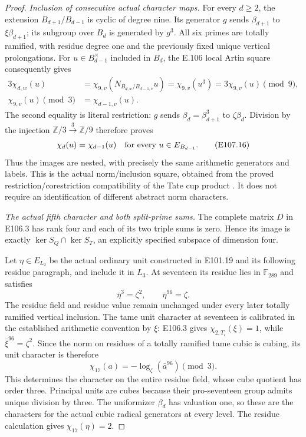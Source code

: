 \begin{proof}
\emph{Inclusion of consecutive actual character maps.}
For every \(d\ge2\), the extension
\(B_{d+1}/B_{d-1}\) is cyclic of degree nine. Its generator
\(g\) sends \(\beta_{d+1}\) to \(\xi\beta_{d+1}\);
its subgroup over \(B_d\) is generated by \(g^3\).
All six primes are totally ramified, with residue degree one
and the previously fixed unique vertical prolongations.
For \(u\in B_{d-1}^\times\) included in \(B_d\), the E.106
local Artin square consequently gives
\[
 \begin{aligned}
 3\chi_{d,w}(u)
  &=\chi_{9,v}(N_{B_{d,w}/B_{d-1,v}}u)
    =\chi_{9,v}(u^3)=3\chi_{9,v}(u)\pmod9,\\
 \chi_{9,v}(u)\pmod3&=\chi_{d-1,v}(u).
 \end{aligned}
 \tag{E107.15}
\]
The second equality is literal restriction: \(g\) sends
\(\beta_d=\beta_{d+1}^3\) to \(\zeta\beta_d\).
Division by the injection \(\mathbb Z/3\xrightarrow{\,3\,}\mathbb Z/9\)
therefore proves
\[
        \chi_d(u)=\chi_{d-1}(u)
              \quad\hbox{for every }u\in E_{B_{d-1}}.
 \tag{E107.16}
\]
Thus the images are nested, with precisely the same arithmetic
generators and labels. This is the actual norm/inclusion square,
obtained from the proved restriction/corestriction compatibility
of the Tate cup product
\cite[III,Theorem3.1 and its proof; III,\S4]{E_MilneCFT}.
It does not require an identification of different abstract norm
characters.

\emph{The actual fifth character and both split-prime sums.}
The complete matrix \(D\) in E106.3 has rank four and each of
its two triple sums is zero. Hence its image is exactly
\(\ker S_Q\cap\ker S_T\), an explicitly specified subspace
of dimension four.

Let \(\eta\in E_{L_2}\) be the actual ordinary unit constructed
in E101.19 and its following residue paragraph, and include it in \(L_3\). At seventeen its
residue lies in \(\mathbb F_{289}\) and satisfies
\[
                  \bar\eta^3=\zeta^2,\qquad
                  \bar\eta^{96}=\zeta .
 \tag{E107.17}
\]
The residue field and residue value remain unchanged under every
later totally ramified vertical inclusion. The tame unit
character at seventeen is calibrated in the established
arithmetic convention by \(\xi\): E106.3 gives
\(\chi_{2,T_i}(\xi)=1\), while
\(\bar\xi^{96}=\zeta^2\). Since the norm on residues of a
totally ramified tame cubic is cubing, its unit character is
therefore
\[
       \chi_{17}(a)=-\log_\zeta(\bar a^{96})\pmod3 .
 \tag{E107.18}
\]
This determines the character on the entire residue field, whose
cube quotient has order three. Principal units are cubes because
their pro-seventeen group admits unique division by three.
The uniformizer \(\beta_d\) has valuation one, so these are the
characters for the actual cubic radical generators at every
level. The residue calculation gives \(\chi_{17}(\eta)=2\).


\end{proof}
